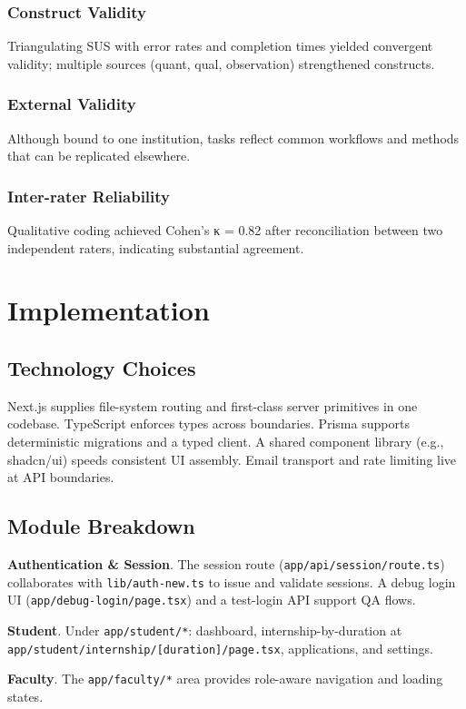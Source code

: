 \documentclass[conference]{IEEEtran}
\begin{document}
\subsubsection{Construct Validity}
Triangulating SUS with error rates and completion times yielded convergent validity; multiple sources (quant, qual, observation) strengthened constructs.

\subsubsection{External Validity}
Although bound to one institution, tasks reflect common workflows and methods that can be replicated elsewhere.

\subsubsection{Inter-rater Reliability}
Qualitative coding achieved Cohen's κ = 0.82 after reconciliation between two independent raters, indicating substantial agreement.

\section{Implementation}
\subsection{Technology Choices}
Next.js supplies file-system routing and first-class server primitives in one codebase. TypeScript enforces types across boundaries. Prisma supports deterministic migrations and a typed client. A shared component library (e.g., shadcn/ui) speeds consistent UI assembly. Email transport and rate limiting live at API boundaries.

\subsection{Module Breakdown}
\textbf{Authentication \& Session}. The session route (\texttt{app/api/session/route.ts}) collaborates with \texttt{lib/auth-new.ts} to issue and validate sessions. A debug login UI (\texttt{app/debug-login/page.tsx}) and a test-login API support QA flows.

\textbf{Student}. Under \texttt{app/student/*}: dashboard, internship-by-duration at \texttt{app/student/internship/[duration]/page.tsx}, applications, and settings.

\textbf{Faculty}. The \texttt{app/faculty/*} area provides role-aware navigation and loading states.
\end{document}
